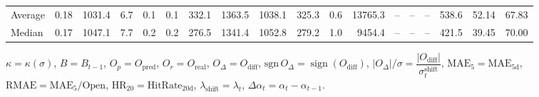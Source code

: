 \begin{threeparttable}
{\begin{tabular}{lrrrrrrrrrrrrrrrrr}
Average &     0.18 & 1031.4 &               6.7 &               0.1 &                0.1 &              332.1 & 1363.5 & 1038.1 &      325.3 &                      0.6 &             13765.3 &         -- &        -- &             -- &            538.6 &           52.14 &                  67.83 \\
 Median &     0.17 & 1047.1 &               7.7 &               0.2 &                0.2 &              276.5 & 1341.4 & 1052.8 &      279.2 &                      1.0 &              9454.4 &         -- &        -- &             -- &            421.5 &           39.45 &                  70.00 \\
\bottomrule
\end{tabular}
}
\begin{tablenotes}\footnotesize
\item $\kappa=\kappa(\sigma)$, $B=B_{t-1}$, $O_p=O_{\text{pred}}$, $O_r=O_{\text{real}}$, $O_\Delta=O_{\text{diff}}$, $\mathrm{sgn}\,O_\Delta=\operatorname{sign}(O_{\text{diff}})$, $|O_\Delta|/\sigma=\dfrac{|O_{\text{diff}}|}{\sigma_t^{\text{shift}}}$, $\mathrm{MAE}_5=\mathrm{MAE}_{5\text{d}}$, $\mathrm{RMAE}= \mathrm{MAE}_5 / \text{Open}$, $\mathrm{HR}_{20}=\mathrm{HitRate}_{20\text{d}}$, 
$\lambda_{\text{shift}}=\lambda_t$, 
$\Delta\alpha_t=\alpha_t-\alpha_{t-1}$.
\end{tablenotes}
\end{threeparttable}
\endgroup


